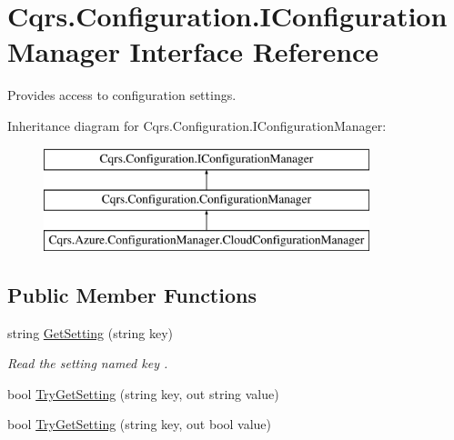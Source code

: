 \hypertarget{interfaceCqrs_1_1Configuration_1_1IConfigurationManager}{}\section{Cqrs.\+Configuration.\+I\+Configuration\+Manager Interface Reference}
\label{interfaceCqrs_1_1Configuration_1_1IConfigurationManager}


Provides access to configuration settings.  


Inheritance diagram for Cqrs.\+Configuration.\+I\+Configuration\+Manager\+:\begin{figure}[H]
\begin{center}
\leavevmode
\includegraphics[height=3.000000cm]{interfaceCqrs_1_1Configuration_1_1IConfigurationManager}
\end{center}
\end{figure}
\subsection*{Public Member Functions}
\begin{DoxyCompactItemize}
\item 
string \hyperlink{interfaceCqrs_1_1Configuration_1_1IConfigurationManager_a9f7b7d4d8c26a0589f01c8a7f69901ef_a9f7b7d4d8c26a0589f01c8a7f69901ef}{Get\+Setting} (string key)
\begin{DoxyCompactList}\small\item\em Read the setting named {\itshape key} . \end{DoxyCompactList}\item 
bool \hyperlink{interfaceCqrs_1_1Configuration_1_1IConfigurationManager_ac4478405e3d9e1c97d14953aea4e695b_ac4478405e3d9e1c97d14953aea4e695b}{Try\+Get\+Setting} (string key, out string value)
\item 
bool \hyperlink{interfaceCqrs_1_1Configuration_1_1IConfigurationManager_a8389181330999fcb8e30af4dbb56d35e_a8389181330999fcb8e30af4dbb56d35e}{Try\+Get\+Setting} (string key, out bool value)
\end{DoxyCompactItemize}


